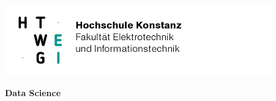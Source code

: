 \noindent
\begin{minipage}[t]{0.4\textwidth} 
\includegraphics[width=\linewidth]{htwg_logo.png}
\end{minipage}%
\hfill%
\begin{minipage}[t]{0.6\textwidth}\raggedleft
\textbf{\large Data Science}
\end{minipage}


